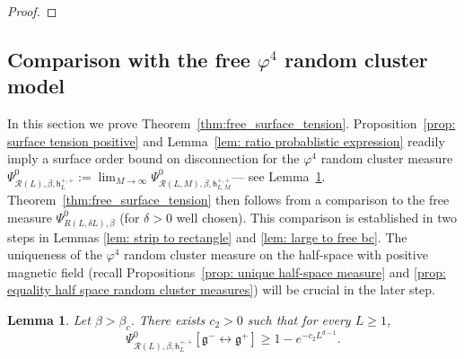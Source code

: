 \documentclass[11pt,a4paper]{article}
\newtheorem{lemma}[theorem]{Lemma}
\theoremstyle{definition}
\numberwithin{equation}{section}
\newcommand\fg{\mathfrak{g}}
\newcommand\cR{\mathcal{R}}
\begin{document}
\begin{proof}


\end{proof}



\subsection{Comparison with the free $\varphi^4$ random cluster model}\label{prop:from thick plus to free}

In this section we prove Theorem~\ref{thm:free_surface_tension}. Proposition~\ref{prop: surface tension positive} and Lemma~\ref{lem: ratio probablistic expression} readily imply a surface order bound on disconnection for the $\varphi^4$ random cluster measure $\Psi^{0}_{\mathcal R(L),\beta,\mathsf{h}^{+,+}_{L}}:=\lim_{M\to\infty}\Psi^{0}_{\mathcal R(L,M),\beta,\mathsf{h}^{+,+}_{L,M}}$--- see Lemma~\ref{lem: positivity of tau}. Theorem~\ref{thm:free_surface_tension} then follows from a comparison to the free measure $\Psi^0_{R(L,\delta L),\beta}$ (for $\delta>0$ well chosen). This comparison is established in two steps in Lemmas \ref{lem: strip to rectangle} and \ref{lem: large to free bc}. The uniqueness of the $\varphi^4$ random cluster measure on the half-space with positive magnetic field (recall Propositions~\ref{prop: unique half-space measure} and \ref{prop: equality half space random cluster measures}) will be crucial in the later step.



\begin{lemma}\label{lem: positivity of tau}
Let $\beta>\beta_c$. There exists $c_2>0$ such that for every $L \geq 1$,
\begin{equation}\label{eq: proba strip}
\Psi^{0}_{\mathcal R(L),\beta,\mathsf{h}^{+,+}_{L}}[ \fg^{-} \longleftrightarrow \fg^{+}] \geq 1 - e^{-c_2L^{d-1}}.
\end{equation}
\end{lemma}
\end{document}
